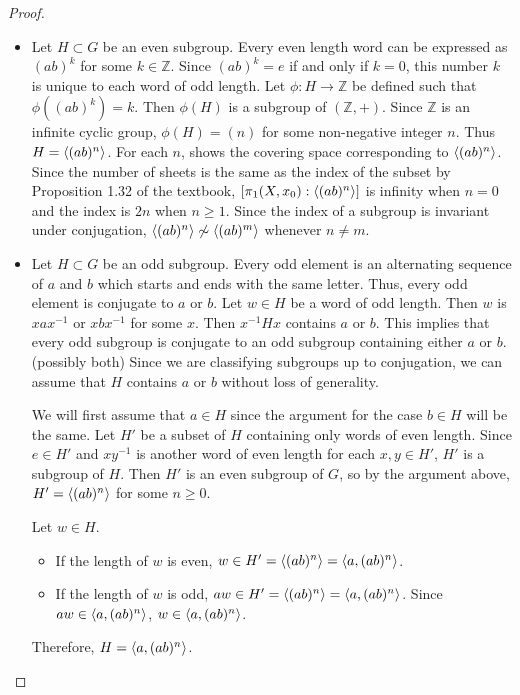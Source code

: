 \documentclass[12pt, psamsfonts]{amsart}
\theoremstyle{definition}
\theoremstyle{remark}
\numberwithin{equation}{section}
\begin{document}
\begin{proof}
  \begin{itemize}
    \item
      Let $H \subset G$ be an even subgroup.
      Every even length word can be expressed as $(ab)^k$ for some $k \in \mathbb{Z}$.
      Since $(ab)^k = e$ if and only if $k = 0$, this number $k$ is unique to each word of odd length.
      Let $\phi: H \rightarrow \mathbb{Z}$ be defined such that $\phi((ab)^k) = k$.
      Then $\phi(H)$ is a subgroup of $(\mathbb{Z}, +)$.
      Since $\mathbb{Z}$ is an infinite cyclic group, $\phi(H) = (n)$ for some non-negative integer $n$.
      Thus $H = \ev{(ab)^n}$.
      For each $n$,  shows the covering space corresponding to $\ev{(ab)^n}$.
      Since the number of sheets is the same as the index of the subset by Proposition 1.32 of the textbook, $[\pi_1(X, x_0):\ev{(ab)^n}]$ is infinity when $n = 0$ and the index is $2n$ when $n \geq 1$.
      Since the index of a subgroup is invariant under conjugation, $\ev{(ab)^n} \not\sim \ev{(ab)^m}$ whenever $n \ne m$.
    \item
      Let $H \subset G$ be an odd subgroup.
      Every odd element is an alternating sequence of $a$ and $b$ which starts and ends with the same letter.
      Thus, every odd element is conjugate to $a$ or $b$.
      Let $w \in H$ be a word of odd length.
      Then $w$ is $xax^{-1}$ or $xbx^{-1}$ for some $x$.
      Then $x^{-1}Hx$ contains $a$ or $b$.
      This implies that every odd subgroup is conjugate to an odd subgroup containing either $a$ or $b$. (possibly both)
      Since we are classifying subgroups up to conjugation, we can assume that $H$ contains $a$ or $b$ without loss of generality.

      We will first assume that $a \in H$ since the argument for the case $b \in H$ will be the same.
      Let $H'$ be a subset of $H$ containing only words of even length.
      Since $e \in H'$ and $xy^{-1}$ is another word of even length for each $x, y \in H'$, $H'$ is a subgroup of $H$.
      Then $H'$ is an even subgroup of $G$, so by the argument above, $H' = \ev{(ab)^n}$ for some $n \geq 0$.

      Let $w \in H$.
      \begin{itemize}
        \item
          If the length of $w$ is even, $w \in H' = \ev{(ab)^n} = \ev{a, (ab)^n}$.
        \item
          If the length of $w$ is odd, $aw \in H' = \ev{(ab)^n} = \ev{a, (ab)^n}$.
          Since $aw \in \ev{a, (ab)^n}$, $w \in \ev{a, (ab)^n}$.
      \end{itemize}
      Therefore, $H = \ev{a, (ab)^n}$.
      

\end{itemize}
\end{proof}
\end{document}
